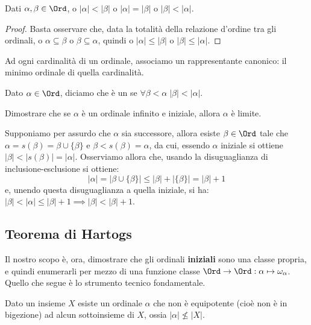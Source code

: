 \documentclass[11pt]{scrartcl}
\begin{document}
\begin{remark}
	Dati $\alpha,\beta \in \Ord$, o $|\alpha| < |\beta|$ o $|\alpha| = |\beta|$ o $|\beta| < |\alpha|$.
\end{remark}

\begin{proof}
	Basta osservare che, data la totalità della relazione d'ordine tra gli ordinali, o $\alpha \subseteq \beta$ o $\beta \subseteq \alpha$, quindi o $|\alpha| \leq |\beta|$ o $|\beta| \leq |\alpha|$.
\end{proof}

Ad ogni cardinalità di un ordinale, associamo un rappresentante canonico: il minimo ordinale di quella cardinalità.

\begin{definition}
	Dato $\alpha \in \Ord$, diciamo che è un  se $\forall \beta < \alpha \; |\beta| < |\alpha|$.
\end{definition}

\begin{exercise}
	Dimostrare che se $\alpha$ è un ordinale infinito e iniziale, allora $\alpha$ è limite.
\end{exercise}

\begin{soln}
	Supponiamo per assurdo che $\alpha$ sia successore, allora esiste $\beta \in \Ord$ tale che $\alpha = s(\beta) = \beta \cup \{\beta\}$ e $\beta < s(\beta) = \alpha$, 
	da cui, essendo $\alpha$ iniziale si ottiene $|\beta| < |s(\beta)| = |\alpha|$. Osserviamo allora che, usando la disuguaglianza di inclusione-esclusione si ottiene:
	\[ |\alpha| = |\beta \cup \{\beta\}| \leq |\beta| + |\{\beta\}| = |\beta| + 1
		\]
	e, unendo questa disuguaglianza a quella iniziale, si ha: $|\beta| < |\alpha| \leq |\beta| + 1 \implies |\beta| < |\beta| + 1$.
\end{soln}

\subsection{Teorema di Hartogs}
Il nostro scopo è, ora, dimostrare che gli ordinali \textbf{iniziali} sono una classe propria, e quindi enumerarli per mezzo di una funzione classe $\Ord \rightarrow \Ord : \alpha \mapsto \omega_\alpha$.
Quello che segue è lo strumento tecnico fondamentale.

\begin{theorem}
	Dato un insieme $X$ esiste un ordinale $\alpha$ che non è equipotente (cioè non è in bigezione) ad alcun sottoinsieme di $X$, ossia $|\alpha| \not\leq |X|$.
\end{theorem}
\end{document}
